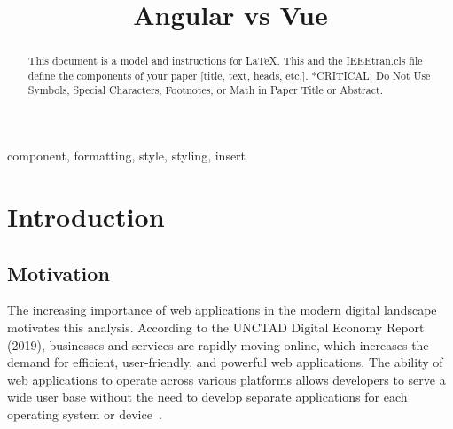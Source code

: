 \documentclass[conference]{IEEEtran}
\begin{document}
\title{Angular vs Vue\\
}

\author{
\and
{}
\and
{}
}

\maketitle

\begin{abstract}
This document is a model and instructions for \LaTeX.
This and the IEEEtran.cls file define the components of your paper [title, text, heads, etc.]. *CRITICAL: Do Not Use Symbols, Special Characters, Footnotes, 
or Math in Paper Title or Abstract.
\end{abstract}

\begin{IEEEkeywords}
component, formatting, style, styling, insert
\end{IEEEkeywords}
\section{Introduction}
\label{cha:Introduction}


\subsection{Motivation}
The increasing importance of web applications in the modern digital landscape motivates this analysis. According to the UNCTAD Digital Economy Report (2019), businesses and services are rapidly moving online, which increases the demand for efficient, user-friendly, and powerful web applications. The ability of web applications to operate across various platforms allows developers to serve a wide user base without the need to develop separate applications for each operating system or device~\cite{unctad}.
\end{document}
